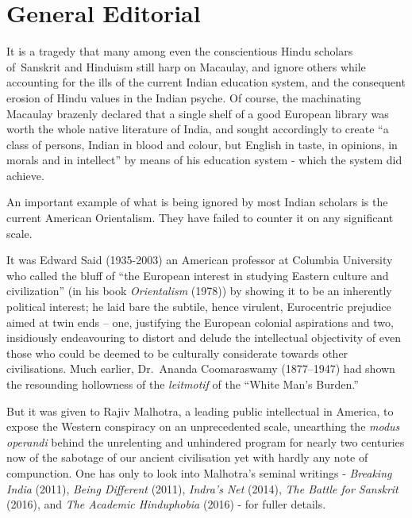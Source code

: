 \chapter*{General Editorial}\label{gen_editorial}



It is a tragedy that many among even the conscientious Hindu scholars of~Sanskrit and Hinduism still harp on Macaulay, and ignore others while accounting for the ills of the current Indian education system, and the consequent erosion of Hindu values in the Indian psyche. Of course, the machinating Macaulay brazenly declared that a single shelf of a good European library was worth the whole native literature of India, and sought accordingly to create “a class of persons, Indian in blood and colour, but English in taste, in opinions, in morals and in intellect” by means of his education system - which the system did achieve. 

An important example of what is being ignored by most Indian scholars is the current American Orientalism. They have failed to counter it on any significant scale. 

It was Edward Said (1935-2003) an American professor at Columbia University who called the bluff of “the European interest in studying Eastern culture and civilization” (in his book {\sl Orientalism} (1978)) by showing it to be an inherently political interest; he laid bare the subtile, hence virulent, Eurocentric prejudice aimed at twin ends – one, justifying the European colonial aspirations and two, insidiously endeavouring to distort  and delude the intellectual objectivity of even those who could be deemed to be culturally considerate towards other civilisations. Much earlier, Dr.\ Ananda Coomaraswamy (1877--1947) had shown the resounding hollowness of the {\sl leitmotif} of the “White Man’s Burden.” 

But it was given to Rajiv Malhotra, a leading public intellectual in America, to expose the Western conspiracy on an unprecedented scale, unearthing the {\sl modus operandi} behind the unrelenting and unhindered program for nearly two centuries now of the sabotage of our ancient civilisation yet with hardly any note of compunction.  One has only to look into Malhotra’s seminal writings - {\sl Breaking India} (2011), {\sl Being Different} (2011), {\sl Indra’s Net} (2014), {\sl The Battle for Sanskrit} (2016), and {\sl The Academic Hinduphobia} (2016) - for fuller details.
\vskip 1.5pt

